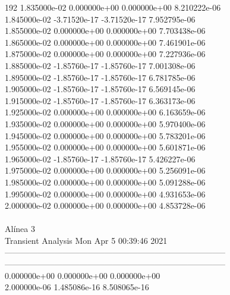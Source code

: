 192	1.835000e-02	0.000000e+00	0.000000e+00	8.210222e-06	\\ 	1.845000e-02	-3.71520e-17	-3.71520e-17	7.952795e-06	\\ 	1.855000e-02	0.000000e+00	0.000000e+00	7.703438e-06	\\ 	1.865000e-02	0.000000e+00	0.000000e+00	7.461901e-06	\\ 	1.875000e-02	0.000000e+00	0.000000e+00	7.227936e-06	\\ 	1.885000e-02	-1.85760e-17	-1.85760e-17	7.001308e-06	\\ 	1.895000e-02	-1.85760e-17	-1.85760e-17	6.781785e-06	\\ 	1.905000e-02	-1.85760e-17	-1.85760e-17	6.569145e-06	\\ 	1.915000e-02	-1.85760e-17	-1.85760e-17	6.363173e-06	\\ 	1.925000e-02	0.000000e+00	0.000000e+00	6.163659e-06	\\ 	1.935000e-02	0.000000e+00	0.000000e+00	5.970400e-06	\\ 	1.945000e-02	0.000000e+00	0.000000e+00	5.783201e-06	\\ 	1.955000e-02	0.000000e+00	0.000000e+00	5.601871e-06	\\ 	1.965000e-02	-1.85760e-17	-1.85760e-17	5.426227e-06	\\ 	1.975000e-02	0.000000e+00	0.000000e+00	5.256091e-06	\\ 	1.985000e-02	0.000000e+00	0.000000e+00	5.091288e-06	\\ 	1.995000e-02	0.000000e+00	0.000000e+00	4.931653e-06	\\ 	2.000000e-02	0.000000e+00	0.000000e+00	4.853728e-06	\\ \hline
\\ \hline
                                   Alínea 3 \\ \hline
                                   Transient Analysis  Mon Apr  5 00:39:46  2021\\ \hline
--------------------------------------------------------------------------------\\ \hline
--------------------------------------------------------------------------------\\ 	0.000000e+00	0.000000e+00	0.000000e+00	\\ 	2.000000e-06	1.485086e-16	8.508065e-16	\\ \hline

